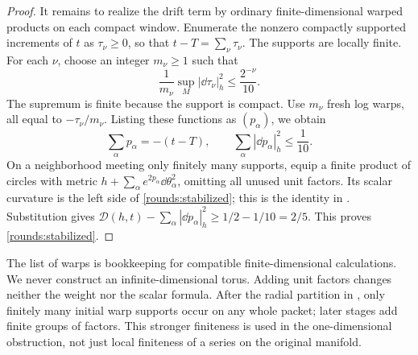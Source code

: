 \begin{proof}
It remains to realize the drift term by ordinary finite-dimensional
warped products on each compact window. Enumerate the nonzero compactly
supported increments of \(t\) as \(\tau_\nu\ge0\), so that
\(t-T=\sum_\nu\tau_\nu\). The supports are locally finite. For each
\(\nu\), choose an integer \(m_\nu\ge1\) such that
\[
 \frac1{m_\nu}\sup_M|\dd\tau_\nu|_h^2\le\frac{2^{-\nu}}{10}.
\]
The supremum is finite because the support is compact. Use \(m_\nu\)
fresh log warps, all equal to \(-\tau_\nu/m_\nu\). Listing these
functions as \((p_\alpha)\), we obtain
\[
 \sum_\alpha p_\alpha=-(t-T),\qquad
 \sum_\alpha|\dd p_\alpha|_h^2\le\frac1{10}.
\]
On a neighborhood meeting only finitely many supports, equip a finite
product of circles with metric
\(h+\sum_\alpha e^{2p_\alpha}\dd\theta_\alpha^2\), omitting all unused
unit factors. Its scalar curvature is the left side of
\eqref{rounds:stabilized}; this is the identity in . Substitution gives
\(\mathcal D(h,t)-\sum_\alpha|\dd p_\alpha|_h^2\ge1/2-1/10=2/5\).
This proves \eqref{rounds:stabilized}.
\end{proof}

\begin{remark}\label{rounds:no-infinite-torus}
The list of warps is bookkeeping for compatible finite-dimensional
calculations. We never construct an infinite-dimensional torus.
Adding unit factors changes neither the weight nor the scalar formula.
After the radial partition in , only
finitely many initial warp supports occur on any whole packet; later
stages add finite groups of factors. This stronger finiteness is used
in the one-dimensional obstruction, not just local finiteness of a
series on the original manifold.
\end{remark}
